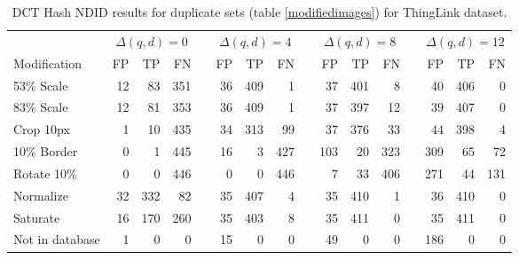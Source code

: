 \documentclass[english,12pt,a4paper,pdftex,elec,utf8, table]{aaltothesis}
\begin{document}
\begin{table}[htb]\footnotesize
\caption{ DCT Hash NDID results for duplicate sets (table \ref{modifiedimages}) for ThingLink dataset. }
\label{thinglinkdctresults}
\begin{center}
  \setlength\tabcolsep{3pt} %
  \begin{tabular}{@{}lrrrrrrrrrrrrrrr@{}}
    \toprule
    & \multicolumn{3}{c}{$\Delta(q,d) = 0$} &\phantom{abc} &\multicolumn{3}{c}{$\Delta(q,d) = 4$} &\phantom{abc} & \multicolumn{3}{c}{$\Delta(q,d)=8$} &\phantom{abc} & \multicolumn{3}{c}{$\Delta(q,d)=12$}\\
\cmidrule{2-4} \cmidrule{6-8} \cmidrule{10-12} \cmidrule{14-16}
    Modification & FP & TP & FN &\phantom{abc} & FP & TP & FN &\phantom{abc} & FP & TP & FN &\phantom{abc} & FP & TP & FN\\ \midrule
    53\% Scale   & 12 & 83 & 351 &\phantom{abc} & 36 & 409 & 1 &\phantom{abc} & 37 & 401 & 8 &\phantom{abc} & 40 & 406 & 0\\
    83\% Scale   & 12 & 81 & 353 &\phantom{abc} & 36 & 409 & 1 &\phantom{abc} & 37 & 397 & 12 &\phantom{abc} & 39 & 407 & 0\\
    Crop 10px    & 1 & 10 & 435 &\phantom{abc} & 34 & 313 & 99 &\phantom{abc} & 37 & 376 & 33 &\phantom{abc} & 44 & 398 & 4\\
    10\% Border  & 0 & 1 & 445 & \phantom{abc} & 16 & 3 & 427 &\phantom{abc} & 103 & 20 & 323&\phantom{abc} & 309 & 65 & 72\\
    Rotate 10\%  & 0 & 0 & 446 &\phantom{abc} & 0 & 0 & 446 &\phantom{abc} & 7 & 33 & 406 &\phantom{abc} & 271 & 44 & 131\\
    Normalize    & 32 & 332 & 82 &\phantom{abc} & 35 & 407 & 4 &\phantom{abc} & 35 & 410 & 1 &\phantom{abc} & 36 & 410 & 0\\
    Saturate     & 16 & 170 & 260 &\phantom{abc} & 35  & 403 & 8 &\phantom{abc} & 35 & 411 & 0 &\phantom{abc} & 35 & 411 & 0\\
   Not in database & 1 & 0 & 0 &\phantom{abc} & 15  & 0 & 0 &\phantom{abc} & 49 & 0 & 0 &\phantom{abc} & 186 & 0 & 0\\
    \bottomrule
\end{tabular}
\end{center}
\end{table}
\end{document}
